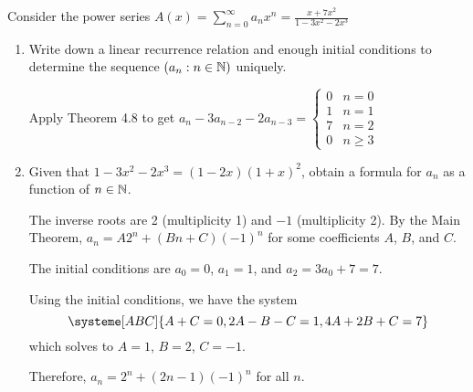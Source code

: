 \begin{xca}
  Consider the power series
  $A(x) = \sum_{n=0}^\infty a_nx^n = \frac{x+7x^2}{1-3x^2-2x^3}$
\end{xca}
\begin{enumerate}
  \item Write down a linear recurrence relation and enough initial conditions
        to determine the sequence $(a_n : n \in \mathbb{N})$ uniquely.
        \begin{sol}
          Apply Theorem 4.8 to get $a_n - 3a_{n-2} - 2a_{n-3} = \begin{cases}
              0 & n = 0    \\
              1 & n = 1    \\
              7 & n = 2    \\
              0 & n \geq 3
            \end{cases}$
        \end{sol}
  \item Given that $1 - 3x^2 - 2x^3 = (1-2x)(1+x)^2$,
        obtain a formula for $a_n$ as a function of $n \in \mathbb{N}$.
        \begin{sol}
          The inverse roots are 2 (multiplicity 1) and $-1$ (multiplicity 2).
          By the Main Theorem, $a_n = A2^n + (Bn+C)(-1)^n$ for some coefficients $A$, $B$, and $C$.

          The initial conditions are $a_0 = 0$, $a_1 = 1$,
          and $a_2 = 3a_0 + 7 = 7$.

          Using the initial conditions, we have the system
          \[ \systeme[ABC]{A+C=0,2A-B-C=1,4A+2B+C=7} \]
          which solves to $A=1$, $B=2$, $C=-1$.

          Therefore, $a_n = 2^n + (2n-1)(-1)^n$ for all $n$.
        \end{sol}
\end{enumerate}

